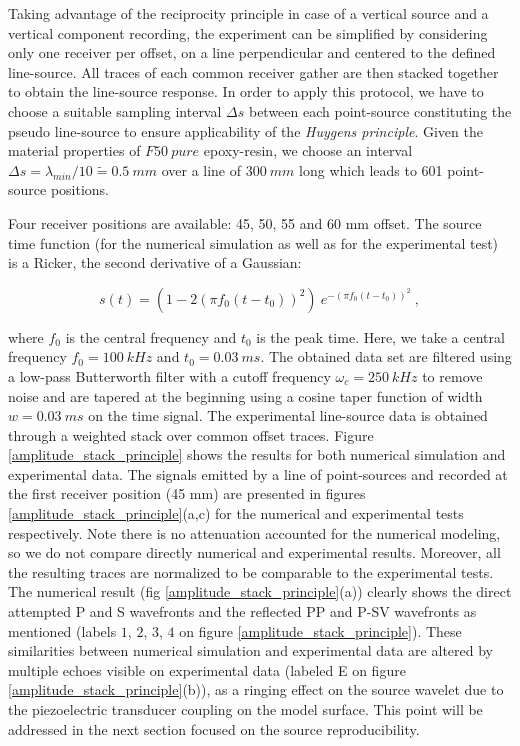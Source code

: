 \documentclass[manuscript,revised]{geophysics}
\begin{document}
\noindent Taking advantage of the reciprocity principle in case of a vertical source and a vertical component recording, the experiment can be simplified by considering only one receiver per offset, on a line perpendicular and centered to the defined line-source. All traces of each common receiver gather are then stacked together to obtain the line-source response. In order to apply this protocol, we have to choose a suitable sampling interval $\Delta s$ between each point-source constituting the pseudo line-source to ensure applicability of the \textit{Huygens principle}. Given the material properties of $F50\ pure$ epoxy-resin, we choose an interval $\Delta s=\lambda_{min}/10 \tilde{=}0.5\ mm$ over a line of $300\ mm$ long which leads to 601 point-source positions.

Four receiver positions are available: 45, 50, 55 and 60 mm offset. The source time function (for the numerical simulation as well as for the experimental test) is a Ricker, the second derivative of a Gaussian:

\begin{equation}
	s(t) = (1-2(\pi f_{0}(t-t_{0}))^{2})~e^{-(\pi f_{0}(t-t_{0}))^{2}}~,
	\label{eq:ricker-source} 
\end{equation}

\noindent where $f_{0}$ is the central frequency and $t_{0}$ is the peak time. Here, we take a central frequency $f_{0}=100\ kHz$ and $t_{0}=0.03\ ms$. The obtained data set are filtered using a low-pass Butterworth filter with a cutoff frequency $\omega_{c}=250\ kHz$ to remove noise and are tapered at the beginning using a cosine taper function of width $w=0.03\ ms$ on the time signal. The experimental line-source data is obtained through a weighted stack over common offset traces. Figure \ref{amplitude_stack_principle} shows the results for both numerical simulation and experimental data. The signals emitted by a line of point-sources and recorded at the first receiver position (45 mm) are presented in figures \ref{amplitude_stack_principle}(a,c) for the numerical and experimental tests respectively.  Note there is no attenuation accounted for the numerical modeling, so we do not compare directly numerical and experimental results. Moreover, all the resulting traces are normalized to be comparable to the experimental tests. The numerical result (fig \ref{amplitude_stack_principle}(a)) clearly shows the direct attempted P and S wavefronts and the reflected PP and P-SV wavefronts as mentioned (labels $1$, $2$, $3$, $4$ on figure \ref{amplitude_stack_principle}). These similarities between numerical simulation and experimental data are altered by multiple echoes visible on experimental data (labeled E on figure \ref{amplitude_stack_principle}(b)), as a ringing effect on the source wavelet due to the piezoelectric transducer coupling on the model surface. This point will be addressed in the next section focused on the source reproducibility.   
\end{document}
